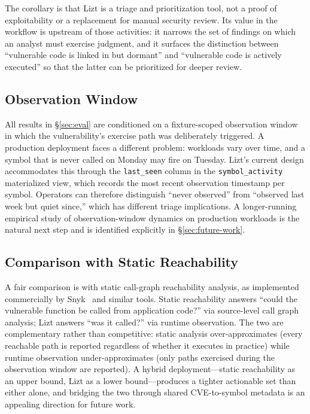 \documentclass[conference]{IEEEtran}
\begin{document}
The corollary is that Lizt is a triage and prioritization tool, not a proof of exploitability or a replacement for manual security review. Its value in the workflow is upstream of those activities: it narrows the set of findings on which an analyst must exercise judgment, and it surfaces the distinction between ``vulnerable code is linked in but dormant'' and ``vulnerable code is actively executed'' so that the latter can be prioritized for deeper review.

\subsection{Observation Window}

All results in \S\ref{sec:eval} are conditioned on a fixture-scoped observation window in which the vulnerability's exercise path was deliberately triggered. A production deployment faces a different problem: workloads vary over time, and a symbol that is never called on Monday may fire on Tuesday. Lizt's current design accommodates this through the \texttt{last\_seen} column in the \texttt{symbol\_activity} materialized view, which records the most recent observation timestamp per symbol. Operators can therefore distinguish ``never observed'' from ``observed last week but quiet since,'' which has different triage implications. A longer-running empirical study of observation-window dynamics on production workloads is the natural next step and is identified explicitly in \S\ref{sec:future-work}.

\subsection{Comparison with Static Reachability}

A fair comparison is with static call-graph reachability analysis, as implemented commercially by Snyk~\cite{snyk} and similar tools. Static reachability answers ``could the vulnerable function be called from application code?'' via source-level call graph analysis; Lizt answers ``was it called?'' via runtime observation. The two are complementary rather than competitive: static analysis over-approximates (every reachable path is reported regardless of whether it executes in practice) while runtime observation under-approximates (only paths exercised during the observation window are reported). A hybrid deployment---static reachability as an upper bound, Lizt as a lower bound---produces a tighter actionable set than either alone, and bridging the two through shared CVE-to-symbol metadata is an appealing direction for future work.
\end{document}
